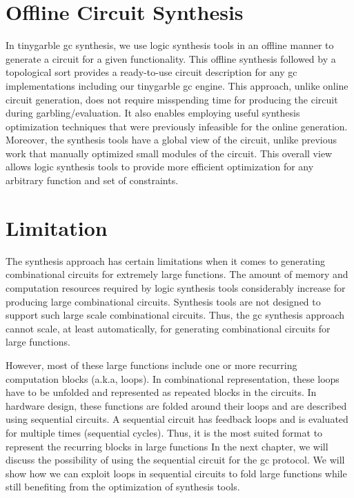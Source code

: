 \section{Offline Circuit Synthesis}\label{sec:syn-offline}
In \gls{tinygarble} \acrshort{gc} synthesis, we use logic synthesis tools in an offline manner to generate a circuit for a given functionality.
This offline synthesis followed by a topological sort provides a ready-to-use circuit description for any \acrshort{gc} implementations including our \gls{tinygarble} \acrshort{gc} engine.
This approach, unlike online circuit generation, does not require misspending time for producing the circuit during garbling/evaluation.
It also enables employing useful synthesis optimization techniques that were previously infeasible for the online generation.
Moreover, the synthesis tools have a global view of the circuit, unlike previous work that manually optimized small modules of the circuit.
This overall view allows logic synthesis tools to provide more efficient optimization for any arbitrary function and set of constraints.

\section{Limitation}\label{sec:syn-limit}
The synthesis approach has certain limitations when it comes to generating combinational circuits for extremely large functions.
The amount of memory and computation resources required by logic synthesis tools considerably increase for producing large combinational circuits.
Synthesis tools are not designed to support such large scale combinational circuits.
Thus, the \acrshort{gc} synthesis approach cannot scale, at least automatically, for generating combinational circuits for large functions.

However, most of these large functions include one or more recurring computation blocks (a.k.a, loops).
In combinational representation, these loops have to be unfolded and represented as repeated blocks in the circuits.
In hardware design, these functions are folded around their loops and are described using sequential circuits.
A sequential circuit has feedback loops and is evaluated for multiple times (sequential cycles).
Thus, it is the most suited format to represent the recurring blocks in large functions
In the next chapter, we will discuss the possibility of using the sequential circuit for the \acrshort{gc} protocol.
We will show how we can exploit loops in sequential circuits to fold large functions while still benefiting from the optimization of synthesis tools.
